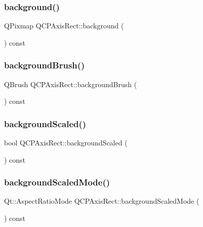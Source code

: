\subsubsection{\texorpdfstring{background()}{background()}}
{\footnotesize\ttfamily Q\+Pixmap Q\+C\+P\+Axis\+Rect\+::background (\begin{DoxyParamCaption}{ }\end{DoxyParamCaption}) const\hspace{0.3cm}{\ttfamily [inline]}}

\mbox{\label{class_q_c_p_axis_rect_a7d09540e3fef12362d00e6bac92b6453}} 
\subsubsection{\texorpdfstring{backgroundBrush()}{backgroundBrush()}}
{\footnotesize\ttfamily Q\+Brush Q\+C\+P\+Axis\+Rect\+::background\+Brush (\begin{DoxyParamCaption}{ }\end{DoxyParamCaption}) const\hspace{0.3cm}{\ttfamily [inline]}}

\mbox{\label{class_q_c_p_axis_rect_a059ede9a5fdcafb5cef280cd65fe4f3a}} 
\subsubsection{\texorpdfstring{backgroundScaled()}{backgroundScaled()}}
{\footnotesize\ttfamily bool Q\+C\+P\+Axis\+Rect\+::background\+Scaled (\begin{DoxyParamCaption}{ }\end{DoxyParamCaption}) const\hspace{0.3cm}{\ttfamily [inline]}}

\mbox{\label{class_q_c_p_axis_rect_a06b98faf54b5491bff780294e423d3ff}} 
\subsubsection{\texorpdfstring{backgroundScaledMode()}{backgroundScaledMode()}}
{\footnotesize\ttfamily Qt\+::\+Aspect\+Ratio\+Mode Q\+C\+P\+Axis\+Rect\+::background\+Scaled\+Mode (\begin{DoxyParamCaption}{ }\end{DoxyParamCaption}) const\hspace{0.3cm}{\ttfamily [inline]}}

